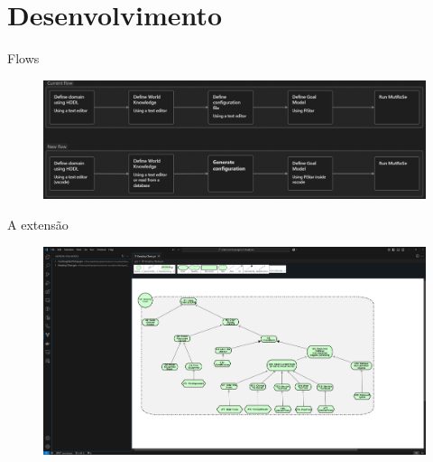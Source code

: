 \documentclass{beamer}
\begin{document}
\section{Desenvolvimento}
\begin{frame}{Flows}
  \begin{figure}[!h]
    \centering
    \includegraphics[width=1\textwidth]{VSCode extension flows.png} 
    \caption{}
  \end{figure}
\end{frame}
\begin{frame}{A extensão}
  \begin{figure}[!h]
    \centering
    \includegraphics[width=1\textwidth]{vscode print.png} 
    \caption{}
  \end{figure}
\end{frame}
\end{document}
